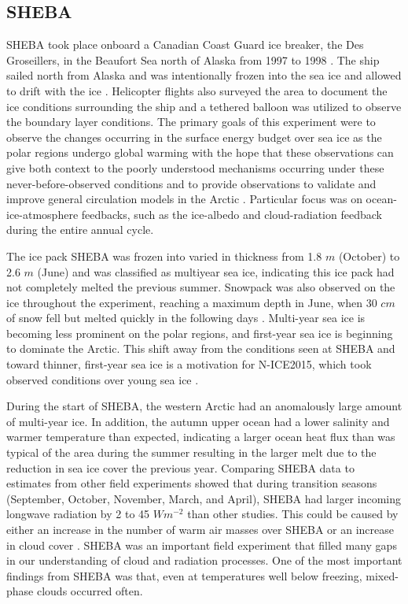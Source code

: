 \subsection{SHEBA}

SHEBA took place onboard a Canadian Coast Guard ice breaker, the Des Groseillers, in the Beaufort Sea north of Alaska from 1997 to 1998 \citep{uttal:2002, shupe:2004}. The ship sailed north from Alaska and was intentionally frozen into the sea ice and allowed to drift with the ice \citep{uttal:2002}. Helicopter flights also surveyed the area to document the ice conditions surrounding the ship and a tethered balloon was utilized to observe the boundary layer conditions. The primary goals of this experiment were to observe the changes occurring in the surface energy budget over sea ice as the polar regions undergo global warming with the hope that these observations can give both context to the poorly understood mechanisms occurring under these never-before-observed conditions and to provide observations to validate and improve general circulation models in the Arctic \citep{uttal:2002}. Particular focus was on ocean-ice-atmosphere feedbacks, such as the ice-albedo and cloud-radiation feedback during the entire annual cycle. 

The ice pack SHEBA was frozen into varied in thickness from 1.8 $m$ (October) to 2.6 $m$ (June) and was classified as multiyear sea ice, indicating this ice pack had not completely melted the previous summer. Snowpack was also observed on the ice throughout the experiment, reaching a maximum depth in June, when 30 $cm$ of snow fell but melted quickly in the following days \citep{uttal:2002}. Multi-year sea ice is becoming less prominent on the polar regions, and first-year sea ice is beginning to dominate the Arctic. This shift away from the conditions seen at SHEBA and toward thinner, first-year sea ice is a motivation for N-ICE2015, which took observed conditions over young sea ice \citep{graham:2017}. 

During the start of SHEBA, the western Arctic had an anomalously large amount of multi-year ice. In addition, the autumn upper ocean had a lower salinity and warmer temperature than expected, indicating a larger ocean heat flux than was typical of the area during the summer resulting in the larger melt due to the reduction in sea ice cover the previous year. Comparing SHEBA data to estimates from other field experiments showed that during transition seasons (September, October, November, March, and April), SHEBA had larger incoming longwave radiation by 2 to 45 $Wm^{-2}$ than other studies. This could be caused by either an increase in the number of warm air masses over SHEBA or an increase in cloud cover \citep{persson:2002}. SHEBA was an important field experiment that filled many gaps in our understanding of cloud and radiation processes. One of the most important findings from SHEBA was that, even at temperatures well below freezing, mixed-phase clouds occurred often. 



